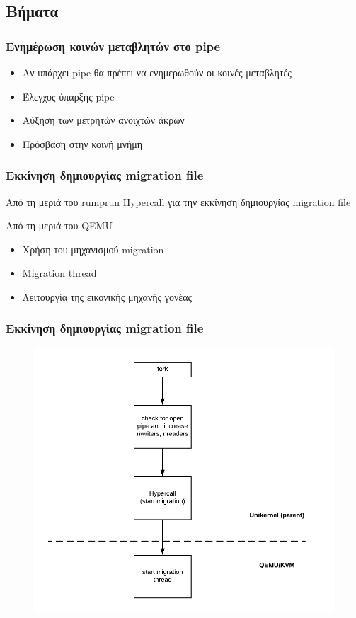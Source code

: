 \documentclass[red,slidestop,notes,compress,mathserif]{beamer}
\begin{document}
\subsection{Βήματα}

\begin{frame}
\frametitle{Ενημέρωση κοινών μεταβλητών στο pipe}
\begin{itemize}
\item Αν υπάρχει pipe θα πρέπει να ενημερωθούν οι κοινές μεταβλητές
\item Έλεγχος ύπαρξης pipe
\item Αύξηση των μετρητών ανοιχτών άκρων
\item Πρόσβαση στην κοινή μνήμη
\end{itemize}
\end{frame}

\begin{frame}
\frametitle{Εκκίνηση δημιουργίας migration file}
\begin{block}{Από τη μεριά του rumprun}
Hypercall για την εκκίνηση δημιουργίας migration file
\end{block}
\begin{block}{Από τη μεριά του QEMU}
\begin{itemize}
\item Χρήση του μηχανισμού migration
\item Migration thread
\item Λειτουργία της εικονικής μηχανής γονέας
\end{itemize}
\end{block}
\end{frame}

\begin{frame}
\frametitle{Εκκίνηση δημιουργίας migration file}
\begin{figure}
\center
\includegraphics[scale=0.57]{figures/fork_stage1.png}
\end{figure}
\end{frame}
\end{document}
